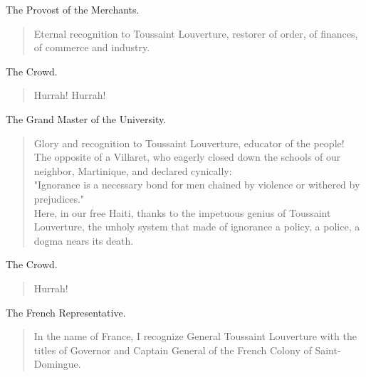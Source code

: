 \documentclass[letterpaper,article,12pt,oneside,notitlepage]{memoir}
\begin{document}
\begin{center}The Provost of the Merchants.\end{center}

\begin{verse}
\indent Eternal recognition to Toussaint Louverture, restorer of order, of finances, of commerce and industry. \\
\end{verse}

\begin{center}The Crowd.\end{center}

\begin{verse}
Hurrah! Hurrah! \\
\end{verse}

\begin{center}The Grand Master of the University.\end{center}

\begin{verse}
Glory and recognition to Toussaint Louverture, educator of the people! The opposite of a Villaret, who eagerly closed down the schools of our neighbor, Martinique, and declared cynically: \\
\indent "Ignorance is a necessary bond for men chained by violence or withered by prejudices."   \\
Here, in our free Haiti, thanks to the impetuous genius of Toussaint Louverture, the unholy system that made of ignorance a policy, a police, a dogma nears its death. \\
\end{verse}

\begin{center}The Crowd.\end{center}

\begin{verse}
Hurrah! \\
\end{verse}

\begin{center}The French Representative.\end{center}

\begin{verse}
\indent In the name of France, I recognize General Toussaint Louverture with the titles of Governor and Captain General of the French Colony of Saint-Domingue. \\
\end{verse}
\end{document}
